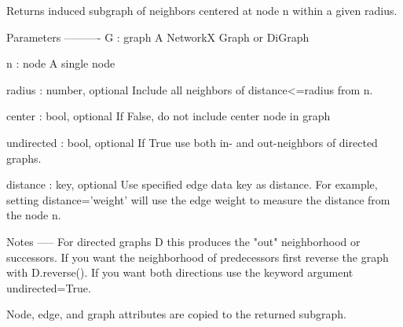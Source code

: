 \begin{DoxyVerb}Returns induced subgraph of neighbors centered at node n within
a given radius.

Parameters
----------
G : graph
  A NetworkX Graph or DiGraph

n : node
  A single node

radius : number, optional
  Include all neighbors of distance<=radius from n.

center : bool, optional
  If False, do not include center node in graph

undirected : bool, optional
  If True use both in- and out-neighbors of directed graphs.

distance : key, optional
  Use specified edge data key as distance.  For example, setting
  distance='weight' will use the edge weight to measure the
  distance from the node n.

Notes
-----
For directed graphs D this produces the "out" neighborhood
or successors.  If you want the neighborhood of predecessors
first reverse the graph with D.reverse().  If you want both
directions use the keyword argument undirected=True.

Node, edge, and graph attributes are copied to the returned subgraph.
\end{DoxyVerb}
 